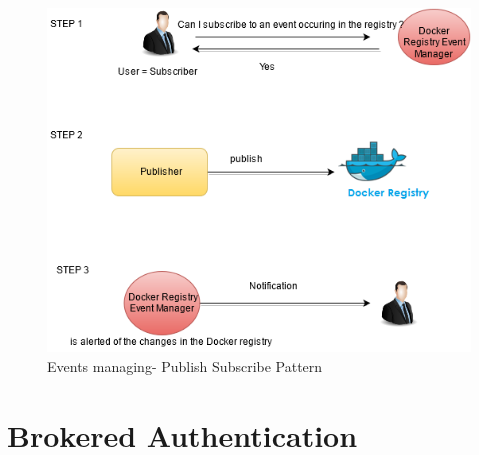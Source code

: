 \begin{figure}[H]
\centering
\includegraphics[scale=0.7]{5-patterns/images/RegistryPS.png}
\caption{Events managing- Publish Subscribe Pattern}
\label{fig:publish-subscribe}
\end{figure}

\section{Brokered Authentication}

